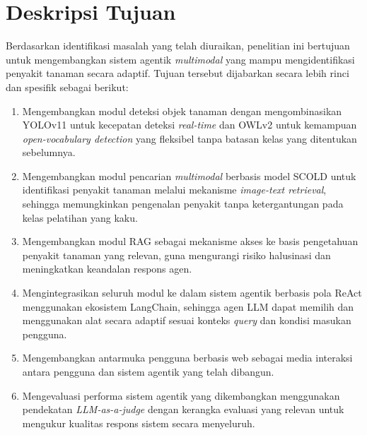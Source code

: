 \section{Deskripsi Tujuan}
Berdasarkan identifikasi masalah yang telah diuraikan, penelitian ini bertujuan untuk mengembangkan sistem agentik \textit{multimodal} yang mampu mengidentifikasi penyakit tanaman secara adaptif. Tujuan tersebut dijabarkan secara lebih rinci dan spesifik sebagai berikut:
\begin{enumerate}[nosep]
    \item Mengembangkan modul deteksi objek tanaman dengan mengombinasikan YOLOv11 untuk kecepatan deteksi \textit{real-time} dan OWLv2 untuk kemampuan \textit{open-vocabulary detection} yang fleksibel tanpa batasan kelas yang ditentukan sebelumnya.
    \item Mengembangkan modul pencarian \textit{multimodal} berbasis model SCOLD untuk identifikasi penyakit tanaman melalui mekanisme \textit{image-text retrieval}, sehingga memungkinkan pengenalan penyakit tanpa ketergantungan pada kelas pelatihan yang kaku.
    \item Mengembangkan modul RAG sebagai mekanisme akses ke basis pengetahuan penyakit tanaman yang relevan, guna mengurangi risiko halusinasi dan meningkatkan keandalan respons agen.
    \item Mengintegrasikan seluruh modul ke dalam sistem agentik berbasis pola ReAct menggunakan ekosistem LangChain, sehingga agen LLM dapat memilih dan menggunakan alat secara adaptif sesuai konteks \textit{query} dan kondisi masukan pengguna.
    \item Mengembangkan antarmuka pengguna berbasis web sebagai media interaksi antara pengguna dan sistem agentik yang telah dibangun.
    \item Mengevaluasi performa sistem agentik yang dikembangkan menggunakan pendekatan \textit{LLM-as-a-judge} dengan kerangka evaluasi yang relevan untuk mengukur kualitas respons sistem secara menyeluruh.
\end{enumerate}

